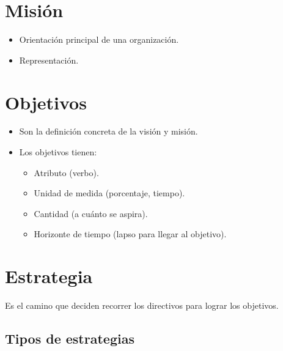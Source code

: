\documentclass[10pt, spanish, a5paper]{article}
\begin{document}
\section{Misión}
\begin{itemize}
	\item Orientación principal de una organización.
	\item Representación.
\end{itemize}

\section{Objetivos}
\begin{itemize}
	\item Son la definición concreta de la visión y misión.
	\item Los objetivos tienen:
	\begin{itemize}
		\item Atributo (verbo).
		\item Unidad de medida (porcentaje, tiempo).
		\item Cantidad (a cuánto se aspira).
		\item Horizonte de tiempo (lapso para llegar al objetivo).
	\end{itemize}
\end{itemize}

\section{Estrategia}

Es el camino que deciden recorrer los directivos para lograr los objetivos.

\subsection{Tipos de estrategias \cite{ansoff}}
\end{document}
